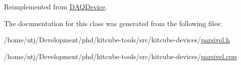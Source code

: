 Reimplemented from \hyperlink{classDAQDevice_acdc9d3765b1dfd845f99ec9c93071811}{D\-A\-Q\-Device}.



The documentation for this class was generated from the following files\-:\begin{DoxyCompactItemize}
\item 
/home/ntj/\-Development/phd/kitcube-\/tools/src/kitcube-\/devices/\hyperlink{parsivel_8h}{parsivel.\-h}\item 
/home/ntj/\-Development/phd/kitcube-\/tools/src/kitcube-\/devices/\hyperlink{parsivel_8cpp}{parsivel.\-cpp}\end{DoxyCompactItemize}
